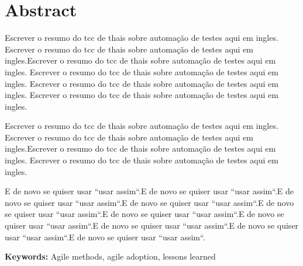 \chapter*{Abstract}

Escrever o resumo do tcc de thais sobre automação de testes aqui em ingles. Escrever o resumo do tcc de thais sobre automação de testes aqui em ingles.Escrever o resumo do tcc de thais sobre automação de testes aqui em ingles. Escrever o resumo do tcc de thais sobre automação de testes aqui em ingles. Escrever o resumo do tcc de thais sobre automação de testes aqui em ingles. Escrever o resumo do tcc de thais sobre automação de testes aqui em ingles.

Escrever o resumo do tcc de thais sobre automação de testes aqui em ingles. Escrever o resumo do tcc de thais sobre automação de testes aqui em ingles.Escrever o resumo do tcc de thais sobre automação de testes aqui em ingles. Escrever o resumo do tcc de thais sobre automação de testes aqui em ingles.

E de novo se quiser usar ``usar assim``.E de novo se quiser usar ``usar assim``.E de novo se quiser usar ``usar assim``.E de novo se quiser usar ``usar assim``.E de novo se quiser usar ``usar assim``.E de novo se quiser usar ``usar assim``.E de novo se quiser usar ``usar assim``.E de novo se quiser usar ``usar assim``.E de novo se quiser usar ``usar assim``.E de novo se quiser usar ``usar assim``.

\textbf{Keywords:} Agile methods, agile adoption, lessons learned
